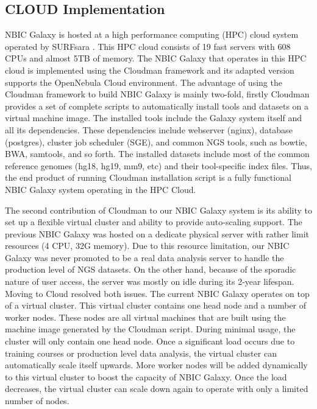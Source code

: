\subsection*{CLOUD Implementation}

NBIC Galaxy is hosted at a high performance computing (HPC) cloud system operated by SURFsara \cite{url-surfsara}. This HPC cloud consists of 19 fast servers with 608 CPUs and almost 5TB of memory. The NBIC Galaxy that operates in this HPC cloud is implemented using the Cloudman framework \cite{afgan} and its adapted version supports the OpenNebula Cloud environment. The advantage of using the Cloudman framework to build NBIC Galaxy is mainly two-fold, firstly Cloudman provides a set of complete scripts to automatically install tools and datasets on a virtual machine image. The installed tools include the Galaxy system itself and all its dependencies. These dependencies include webserver (nginx), database (postgres), cluster job scheduler (SGE), and common NGS tools, such as bowtie, BWA, samtools, and so forth. The installed datasets include most of the common reference genomes (hg18, hg19, mm9, etc) and their tool-specific index files. Thus, the end product of running Cloudman installation script is a fully functional NBIC Galaxy system operating in the HPC Cloud.

The second contribution of Cloudman to our NBIC Galaxy system is its ability to set up a flexible virtual cluster and ability to provide auto-scaling support. The previous NBIC Galaxy was hosted on a dedicate physical server with rather limit resources (4 CPU, 32G memory). Due to this resource limitation, our NBIC Galaxy was never promoted to be a real data analysis server to handle the production level of NGS datasets. On the other hand, because of the sporadic nature of user access, the server was mostly on idle during its 2-year lifespan. Moving to Cloud resolved both issues. The current NBIC Galaxy operates on top of a virtual cluster. This virtual cluster contains one head node and a number of worker nodes. These nodes are all virtual machines that are built using the machine image generated by the Cloudman script. During minimal usage, the cluster will only contain one head node. Once a significant load occurs due to training courses or production level data analysis, the virtual cluster can automatically scale itself upwards. More worker nodes will be added dynamically to this virtual cluster to boost the capacity of NBIC Galaxy. Once the load decreases, the virtual cluster can scale down again to operate with only a limited number of nodes.

